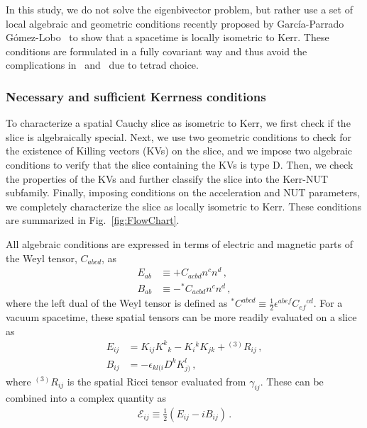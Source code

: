 In this study, we do not solve the eigenbivector problem, but rather use a set of local algebraic and geometric conditions recently proposed by Garc\'{i}a-Parrado G\'{o}mez-Lobo~\cite{lobo16} to show that a spacetime is locally isometric to Kerr. These conditions are formulated in a fully covariant way and thus avoid the complications in~\cite{Campanelli:2008dv} and~\cite{Owen:2010vw} due to tetrad choice. 

\subsubsection{Necessary and sufficient Kerrness conditions}
\label{sec:KerrnessTheory}

To characterize a spatial Cauchy slice as isometric to Kerr, we first check if the slice is algebraically special. Next, we use two geometric conditions to check for the existence of Killing vectors (KVs) on the slice, and we impose two algebraic conditions to verify that the slice containing the KVs is type D. Then, we check the properties of the KVs and further classify the slice into the Kerr-NUT subfamily. Finally, imposing conditions on the acceleration and NUT parameters, we completely characterize the slice as locally isometric to Kerr. These conditions are summarized in Fig.~\ref{fig:FlowChart}. 


All algebraic conditions are expressed in terms of electric and magnetic parts of the Weyl tensor, $C_{abcd}$, as
\begin{align}
E_{ab} &\equiv + C_{acbd}n^c n^d \,, \\
B_{ab} &\equiv -{}^*C_{acbd}n^c n^d \,,
\end{align}
where the left dual of the Weyl tensor is defined as ${}^* C^{abcd} \equiv \frac{1}{2}\epsilon^{abef}C_{ef}{}^{cd}$. For a vacuum spacetime, these spatial tensors can be more readily evaluated on a slice as
\begin{align}
\label{eq:electricweyl}
E_{ij} &= K_{ij}K^k{}_k - K_{i}{}^k K_{jk} + {}^{(3)}R_{ij} \,, \\
B_{ij} &= -\epsilon_{kl(i}D^k K_{j)}^l \,,
\end{align}
where ${}^{(3)}R_{ij}$ is the spatial Ricci tensor evaluated from $\gamma_{ij}$. These can be combined into a complex quantity as
\begin{align}
\mathcal{E}_{ij} \equiv \frac{1}{2}\left(E_{ij} - iB_{ij}\right) \,.
\end{align}

